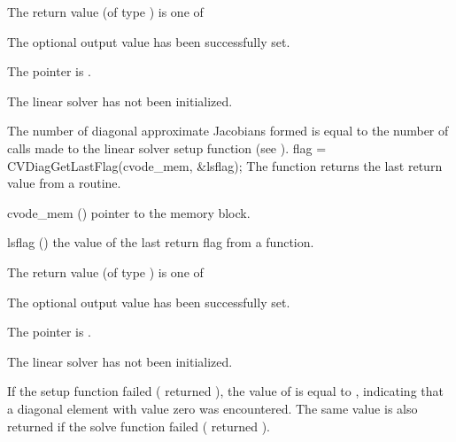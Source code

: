 {
  The return value  (of type ) is one of
  \begin{args}
  \item[\Id{CVDIAG\_SUCCESS}] 
    The optional output value has been successfully set.
  \item[\Id{CVDIAG\_MEM\_NULL}]
    The  pointer is .
  \item[\Id{CVDIAG\_LMEM\_NULL}]
    The {\cvdiag} linear solver has not been initialized.
  \end{args}
}
{
  The number of diagonal approximate Jacobians formed is
  equal to the number of calls made to the linear solver setup function
  (see ).
}
{
  flag = CVDiagGetLastFlag(cvode\_mem, \&lsflag);
}
{
  The function  returns the
  last return value from a {\cvdiag} routine. 
}
{
  \begin{args}
  \item[cvode\_mem] ()
    pointer to the {\cvodes} memory block.
  \item[lsflag] ()
    the value of the last return flag from a {\cvdiag} function.
  \end{args}
}
{
  The return value  (of type ) is one of
  \begin{args}
  \item[\Id{CVDIAG\_SUCCESS}] 
    The optional output value has been successfully set.
  \item[\Id{CVDIAG\_MEM\_NULL}]
    The  pointer is .
  \item[\Id{CVDIAG\_LMEM\_NULL}]
    The {\cvdiag} linear solver has not been initialized.
  \end{args}
}
{
  If the {\cvdiag} setup function failed ( returned ),
  the value of  is equal to , indicating that a
  diagonal element with value zero was encountered.
  The same value is also returned if the {\cvdiag} solve function failed
  ( returned ).
}


